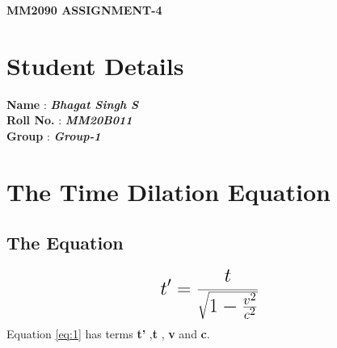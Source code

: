 \documentclass[a4paper, 12pt]{article}
\begin{document}
\begin{center}
	{\LARGE {\textbf {MM2090 ASSIGNMENT-4}}}
\end{center}

\section{Student Details}
\textbf {Name} : \textbf{\textit {Bhagat Singh S}}\\
\textbf {Roll No.} : \textbf{\textit {MM20B011}}\\
\textbf {Group} : \textbf{\textit {Group-1}}
\section{The Time Dilation Equation}
\subsection{The Equation}
\begin{equation}
	{\LARGE{\textbf{$t' =\frac{t}{ \sqrt {1 - {\frac{v^2}{c^2}}}}$}}}
	\label{eq:1}
\end{equation}
{\normalsize {Equation \ref{eq:1}  has terms \textbf{t'} ,\textbf{t} , \textbf{v} and \textbf{c}.}}
\end{document}
